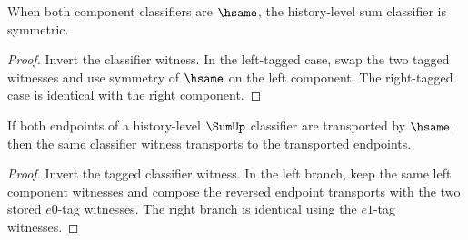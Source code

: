 

\begin{theorem}
\label{thm:sum-history-classifier-hsame-symmetry}
When both component classifiers are \(\hsame\), the history-level sum classifier is symmetric.
\end{theorem}
\begin{proof}
Invert the classifier witness. In the left-tagged case, swap the two tagged witnesses and use symmetry of \(\hsame\) on the left component. The right-tagged case is identical with the right component.
\end{proof}

\begin{theorem}
\label{thm:sum-history-classifier-hsame-transport}
If both endpoints of a history-level \(\SumUp\) classifier are transported by
\(\hsame\), then the same classifier witness transports to the transported
endpoints.
\end{theorem}
\begin{proof}
Invert the tagged classifier witness. In the left branch, keep the same left
component witnesses and compose the reversed endpoint transports with the two
stored \(e0\)-tag witnesses. The right branch is identical using the \(e1\)-tag
witnesses.
\end{proof}

